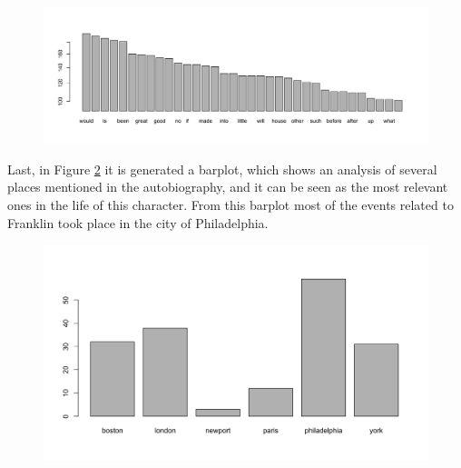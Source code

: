 \documentclass[10pt,leter,openany]{article}
\begin{document}
\begin{figure}
	\begin{center}
		\includegraphics[scale=0.23]{img/barplot_relevant_words_ordered}
		\label{fig:barplot_words2}
	\end{center}
\end{figure}
	
	Last, in Figure \ref{fig:barplot_places} it is generated a barplot, which shows an analysis of several places mentioned in the autobiography, and it can be seen as the most relevant ones in the life of this character. From this barplot most of the events related to Franklin took place in the city of Philadelphia.
	
	\begin{figure}
		\begin{center}
			\includegraphics[scale=0.30]{img/barplot_places}
			\label{fig:barplot_places}
		\end{center}
	\end{figure}

\newpage

	
	
	
\end{document}
